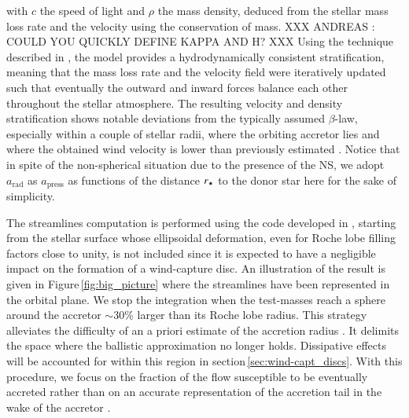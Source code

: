 \documentclass{aa}
\makeatletter
\newcommand*{\ns}{NS\@\xspace}
\newcommand{\mystar}{{\fontfamily{lmr}\selectfont$\star$}}
\makeatother
\begin{document}
with $c$ the speed of light and $\rho$ the mass density, deduced from the stellar mass loss rate and the velocity using the conservation of mass. XXX ANDREAS : COULD YOU QUICKLY DEFINE KAPPA AND H? XXX Using the technique described in \cite{Sander2017b}, the model provides a hydrodynamically consistent stratification, meaning that the mass loss rate and the velocity field were iteratively updated such that eventually the outward and inward forces balance each other throughout the stellar atmosphere. The resulting velocity and density stratification shows notable deviations from the typically assumed $\beta$-law, especially within a couple of stellar radii, where the orbiting accretor lies and where the obtained wind velocity is lower than previously estimated \citep{Gimenez-Garcia2016}. Notice that in spite of the non-spherical situation due to the presence of the \ns, we adopt $a_\text{rad}$ as $a_\text{press}$ as functions of the distance $r_{\text{\mystar}}$ to the donor star here for the sake of simplicity.

The streamlines computation is performed using the code developed in \cite{ElMellah2016a}, starting from the stellar surface whose ellipsoidal deformation, even for Roche lobe filling factors close to unity, is not included since it is expected to have a negligible impact on the formation of a wind-capture disc. An illustration of the result is given in Figure\,\ref{fig:big_picture} where the streamlines have been represented in the orbital plane. We stop the integration when the test-masses reach a sphere around the accretor $\sim$30\% larger than its Roche lobe radius. This strategy alleviates the difficulty of an a priori estimate of the accretion radius \citep[the critical impact parameter below which test-masses are captured in the BHL formalism,][]{Edgar:2004ip}. It delimits the space where the ballistic approximation no longer holds. Dissipative effects will be accounted for within this region in section\,\ref{sec:wind-capt_discs}. With this procedure, we focus on the fraction of the flow susceptible to be eventually accreted rather than on an accurate representation of the accretion tail in the wake of the accretor \citep[for this component, see rather][]{Manousakis2013}.
\end{document}
